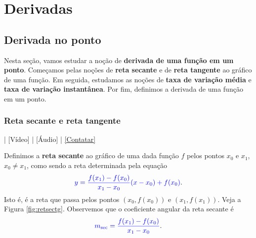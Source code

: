 
\chapter{Derivadas}\label{cap_deriv}
\thispagestyle{fancy}

\section{Derivada no ponto}\label{cap_deriv_sec_derivpt}

Nesta seção, vamos estudar a noção de {\bf derivada de uma função em um ponto}. Começamos pelas noções de {\bf reta secante} e de {\bf reta tangente} ao gráfico de uma função. Em seguida, estudamos as noções de {\bf taxa de variação média} e {\bf taxa de variação instantânea}. Por fim, definimos a derivada de uma função em um ponto.

\subsection{Reta secante e reta tangente}

\begin{flushright}
  [YouTube] | [Vídeo] | [Áudio] | \href{https://phkonzen.github.io/notas/contato.html}{[Contatar]}
\end{flushright}

Definimos a {\bf reta secante} ao gráfico de uma dada função $f$ pelos pontos $x_0$ e $x_1$, $x_0\neq x_1$, como sendo a reta determinada pela equação
\begin{equation}
  {\color{blue}y = \frac{f(x_1)-f(x_0)}{x_1-x_0}(x-x_0)+f(x_0)}.
\end{equation}
Isto é, é a reta que passa pelos pontos $(x_0,f(x_0))$ e $(x_1,f(x_1))$. Veja a Figura \ref{fig:retsectg}. Observemos que o coeficiente angular da reta secante é
\begin{equation}
  {\color{blue}m_{\text{sec}} = \frac{f(x_1)-f(x_0)}{x_1-x_0}}.
\end{equation}

